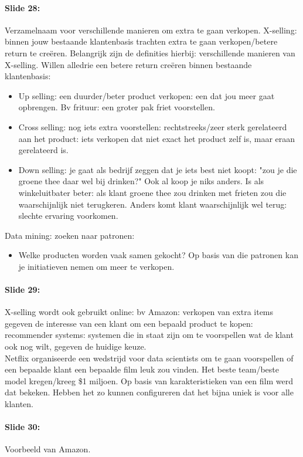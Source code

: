 \documentclass[10pt,a4paper]{report}
\begin{document}
\paragraph{Slide 28:}Verzamelnaam voor verschillende manieren om extra te gaan verkopen. X-selling: binnen jouw bestaande klantenbasis trachten extra te gaan verkopen/betere return te creëren. Belangrijk zijn de definities hierbij: verschillende manieren van X-selling. Willen alledrie een betere return creëren binnen bestaande klantenbasis:
\begin{itemize}
\item Up selling: een duurder/beter product verkopen: een dat jou meer gaat opbrengen. Bv frituur: een groter pak friet voorstellen.
\item Cross selling: nog iets extra voorstellen: rechtstreeks/zeer sterk gerelateerd aan het product: iets verkopen dat niet exact het product zelf is, maar eraan gerelateerd is.
\item Down selling: je gaat als bedrijf zeggen dat je iets best niet koopt: "zou je die groene thee daar wel bij drinken?" Ook al koop je niks anders. Is als winkeluitbater beter: als klant groene thee zou drinken met frieten zou die waarschijnlijk niet terugkeren. Anders komt klant waarschijnlijk wel terug: slechte ervaring voorkomen. 
\end{itemize}
Data mining: zoeken naar patronen:
\begin{itemize}
\item Welke producten worden vaak samen gekocht? Op basis van die patronen kan je initiatieven nemen om meer te verkopen. 
\end{itemize}

\paragraph{Slide 29:}X-selling wordt ook gebruikt online: bv Amazon: verkopen van extra items gegeven de interesse van een klant om een bepaald product te kopen: recommender systems: systemen die in staat zijn om te voorspellen wat de klant ook nog wilt, gegeven de huidige keuze.\\
Netflix organiseerde een wedstrijd voor data scientists om te gaan voorspellen of een bepaalde klant een bepaalde film leuk zou vinden. Het beste team/beste model kregen/kreeg \$1 miljoen. Op basis van karakteristieken van een film werd dat bekeken. Hebben het zo kunnen configureren dat het bijna uniek is voor alle klanten.

\paragraph{Slide 30:}Voorbeeld van Amazon.
\end{document}
